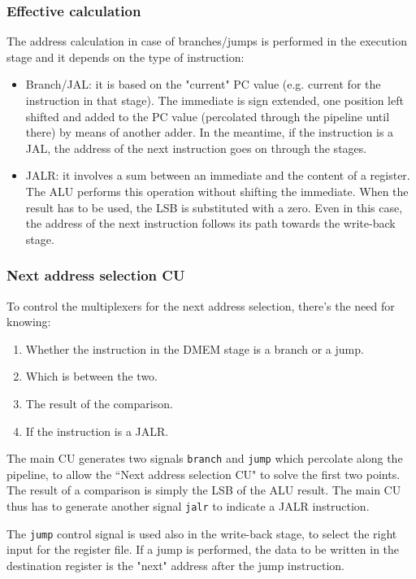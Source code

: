\documentclass[a4paper]{article}
\begin{document}
\subsubsection{Effective calculation}
The address calculation in case of branches/jumps is performed in the execution stage and it depends on the type of instruction:
\begin{itemize}
    \item Branch/JAL: it is based on the "current" PC value (e.g. current for the instruction in that stage). The immediate is sign extended, one position left shifted and added to the PC value (percolated through the pipeline until there) by means of another adder. In the meantime, if the instruction is a JAL, the address of the next instruction goes on through the stages.
    \item JALR: it involves a sum between an immediate and the content of a register. The ALU performs this operation without shifting the immediate. When the result has to be used, the LSB is substituted with a zero. Even in this case, the address of the next instruction follows its path towards the write-back stage.
\end{itemize}

\subsubsection{Next address selection CU}
To control the multiplexers for the next address selection, there's the need for knowing:
\begin{enumerate}
	\item Whether the instruction in the DMEM stage is a branch or a jump.
	\item Which is between the two.
	\item The result of the comparison.
	\item If the instruction is a JALR.
\end{enumerate}
The main CU generates two signals \texttt{branch} and \texttt{jump} which percolate along the pipeline, to allow the ``Next address selection CU" to solve the first two points. The result of a comparison is simply the LSB of the ALU result. 
The main CU thus has to generate another signal \texttt{jalr} to indicate a JALR instruction.

The \texttt{jump} control signal is used also in the write-back stage, to select the right input for the register file. If a jump is performed, the data to be written in the destination register is the "next" address after the jump instruction. 
\end{document}
